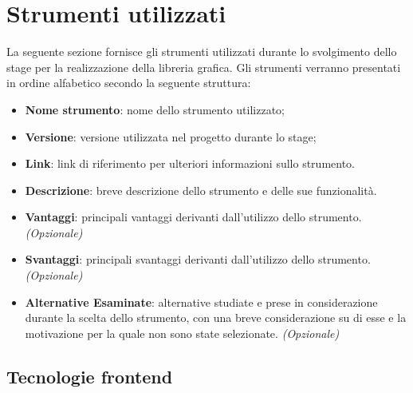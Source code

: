 \section{Strumenti utilizzati}
La seguente sezione fornisce gli strumenti utilizzati durante lo svolgimento dello stage per la realizzazione della libreria grafica.
Gli strumenti verranno presentati in ordine alfabetico secondo la seguente struttura:
\begin{itemize}
      \item \textbf{Nome strumento}: nome dello strumento utilizzato;
      \item \textbf{Versione}: versione utilizzata nel progetto durante lo stage;
      \item \textbf{Link}: link di riferimento per ulteriori informazioni sullo strumento.
      \item \textbf{Descrizione}: breve descrizione dello strumento e delle sue funzionalità.
      \item \textbf{Vantaggi}: principali vantaggi derivanti dall'utilizzo dello strumento. \textit{(Opzionale)}
      \item \textbf{Svantaggi}: principali svantaggi derivanti dall'utilizzo dello strumento. \textit{(Opzionale)}
      \item \textbf{Alternative Esaminate}: alternative studiate e prese in considerazione durante la scelta dello strumento, con una breve considerazione
            su di esse e la motivazione per la quale non sono state selezionate. \textit{(Opzionale)}
\end{itemize}

\subsection{Tecnologie frontend}

